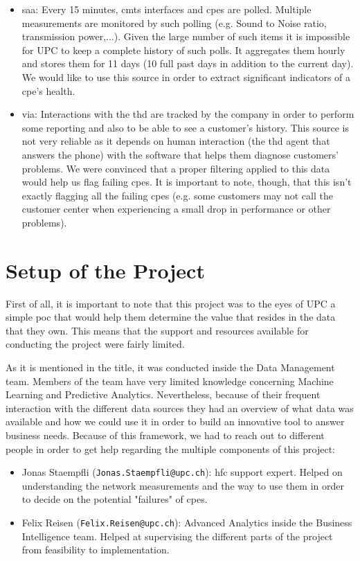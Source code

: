 \begin{itemize}
	\item \acrfull{saa}: Every 15 minutes, \acrshort{cmts} interfaces and \acrshort{cpe}s are polled. Multiple measurements are monitored by such polling (e.g. Sound to Noise ratio, transmission power,...). Given the large number of such items it is impossible for UPC to keep a complete history of such polls. It aggregates them hourly and stores them for 11 days (10 full past days in addition to the current day). We would like to use this source in order to extract significant indicators of a \acrshort{cpe}'s health.
	\item \acrfull{via}: Interactions with the \acrshort{thd} are tracked by the company in order to perform some reporting and also to be able to see a customer's history. This source is not very reliable as it depends on human interaction (the \acrshort{thd} agent that answers the phone) with the software that helps them diagnose customers' problems. We were convinced that a proper filtering applied to this data would help us flag failing \acrshort{cpe}s. It is important to note, though, that this isn't exactly flagging all the failing \acrshort{cpe}s (e.g. some customers may not call the customer center when experiencing a small drop in performance or other problems).
\end{itemize}

\section{Setup of the Project}
\label{sec:setup}
First of all, it is important to note that this project was to the eyes of UPC a simple \acrfull{poc} that would help them determine the value that resides in the data that they own. This means that the support and resources available for conducting the project were fairly limited. 

As it is mentioned in the title, it was conducted inside the Data Management team. Members of the team have very limited knowledge concerning Machine Learning and Predictive Analytics. Nevertheless, because of their frequent interaction with the different data sources they had an overview of what data was available and how we could use it in order to build an innovative tool to answer business needs. Because of this framework, we had to reach out to different people in order to get help regarding the multiple components of this project:
\begin{itemize}
	\item Jonas Staempfli (\texttt{Jonas.Staempfli@upc.ch}): \acrshort{hfc} support expert. Helped on understanding the network measurements and the way to use them in order to decide on the potential "failures" of \acrshort{cpe}s.
	\item Felix Reisen (\texttt{Felix.Reisen@upc.ch}): Advanced Analytics inside the Business Intelligence team. Helped at supervising the different parts of the project from feasibility to implementation.
\end{itemize}

